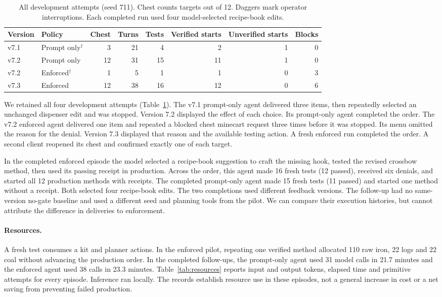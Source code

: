 \documentclass{article}
\begin{document}
\begin{table}[tb]
\centering\small
\caption{All development attempts (seed 711). Chest counts targets out of 12. Daggers mark operator interruptions. Each completed run used four model-selected recipe-book edits.}
\label{tab:follow}
\setlength{\tabcolsep}{4pt}
\begin{tabular}{llrrrrrr}
\toprule
Version & Policy & Chest & Turns & Tests & Verified starts & Unverified starts & Blocks\\
\midrule
v7.1 & Prompt only$^\dagger$ & 3 & 21 & 4 & 2 & 1 & 0\\
v7.2 & Prompt only & 12 & 31 & 15 & 11 & 1 & 0\\
v7.2 & Enforced$^\dagger$ & 1 & 5 & 1 & 1 & 0 & 3\\
v7.3 & Enforced & 12 & 38 & 16 & 12 & 0 & 6\\
\bottomrule
\end{tabular}
\end{table}

We retained all four development attempts (Table~\ref{tab:follow}). The v7.1 prompt-only agent delivered three items, then repeatedly selected an unchanged dispenser edit and was stopped. Version 7.2 displayed the effect of each choice. Its prompt-only agent completed the order. The v7.2 enforced agent delivered one item and repeated a blocked chest minecart request three times before it was stopped. Its menu omitted the reason for the denial. Version 7.3 displayed that reason and the available testing action. A fresh enforced run completed the order. A second client reopened its chest and confirmed exactly one of each target.

In the completed enforced episode the model selected a recipe-book suggestion to craft the missing hook, tested the revised crossbow method, then used its passing receipt in production. Across the order, this agent made 16 fresh tests (12 passed), received six denials, and started all 12 production methods with receipts. The completed prompt-only agent made 15 fresh tests (11 passed) and started one method without a receipt. Both selected four recipe-book edits. The two completions used different feedback versions. The follow-up had no same-version no-gate baseline and used a different seed and planning tools from the pilot. We can compare their execution histories, but cannot attribute the difference in deliveries to enforcement.

\paragraph{Resources.}
A fresh test consumes a kit and planner actions. In the enforced pilot, repeating one verified method allocated 110 raw iron, 22 logs and 22 coal without advancing the production order. In the completed follow-ups, the prompt-only agent used 31 model calls in 21.7 minutes and the enforced agent used 38 calls in 23.3 minutes. Table~\ref{tab:resources} reports input and output tokens, elapsed time and primitive attempts for every episode. Inference ran locally. The records establish resource use in these episodes, not a general increase in cost or a net saving from preventing failed production.
\end{document}
